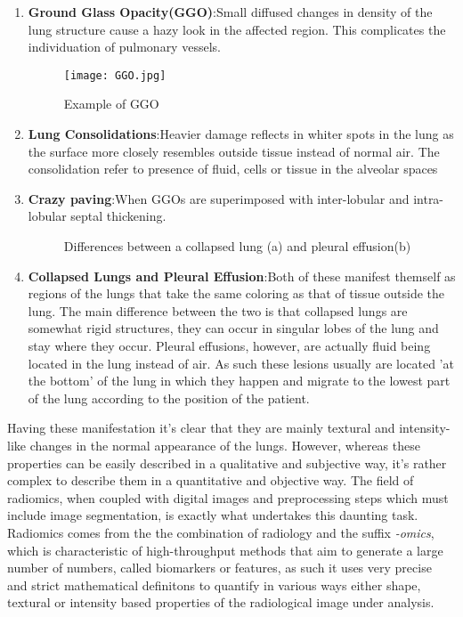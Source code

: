 \begin{enumerate}
        \item \textbf{Ground Glass Opacity(GGO)}:\newline Small diffused changes in density of the lung structure cause a hazy look in the affected region. This complicates the individuation of pulmonary vessels.
			\begin{figure}[htbp]
				\centering
				\texttt{[image: GGO.jpg]}
				\caption{Example of GGO\label{GGOImage}}
			\end{figure}
        \item \textbf{Lung Consolidations}:\newline Heavier damage reflects in whiter spots in the lung as the surface more closely resembles outside tissue instead of normal air. The consolidation refer to presence of fluid, cells or tissue in the alveolar spaces
        \item \textbf{Crazy paving}:\newline When GGOs are superimposed with inter-lobular and intra-lobular septal thickening.
			\begin{figure}[htbp]
				\centering
				\caption{Differences between a collapsed lung (a) and pleural effusion(b)}
			\end{figure}
	\item \textbf{Collapsed Lungs and Pleural Effusion}:\newline Both of these manifest themself as regions of the lungs that take the same coloring as that of tissue outside the lung. The main difference between the two is that collapsed lungs are somewhat rigid structures, they can occur in singular lobes of the lung and stay where they occur. Pleural effusions, however, are actually fluid being located in the lung instead of air. As such these lesions usually are located 'at the bottom' of the lung in which they happen and migrate to the lowest part of the lung according to the position of the patient.
\end{enumerate}

Having these manifestation it's clear that they are mainly textural and intensity-like changes in the normal appearance of the lungs. However, whereas these properties can be easily described in a qualitative and subjective way, it's rather complex to describe them in a quantitative and objective way. The field of radiomics, when coupled with digital images and preprocessing steps which must include image segmentation, is exactly what undertakes this daunting task. Radiomics comes from the the combination of radiology and the suffix \textit{-omics}, which is characteristic of high-throughput methods that aim to generate a large number of numbers, called biomarkers or features, as such it uses very precise and strict mathematical definitons to quantify in various ways either shape, textural or intensity based properties of the radiological image under analysis.

